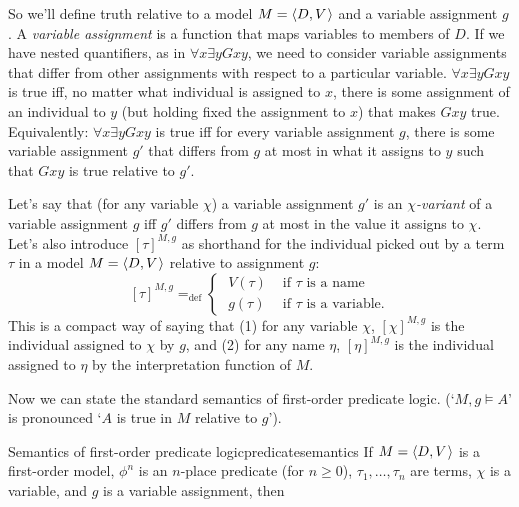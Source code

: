 So we'll define truth relative to a model $M = \t{D,V}$ and a variable
assignment $g$. A \emph{variable assignment} is a function that maps variables
to members of $D$. If we have nested quantifiers, as in
$\forall x \exists y Gxy$, we need to consider variable assignments that differ
from other assignments with respect to a particular variable.
$\forall x \exists y Gxy$ is true iff, no matter what individual is assigned to
$x$, there is some assignment of an individual to $y$ (but holding fixed the
assignment to $x$) that makes $Gxy$ true. Equivalently: $\forall x\exists y Gxy$
is true iff for every variable assignment $g$, there is some variable assignment
$g'$ that differs from $g$ at most in what it assigns to $y$ such that $Gxy$ is
true relative to $g'$.

Let's say that (for any variable $\chi$) a variable assignment $g'$ is an
\emph{$\chi$-variant} of a variable assignment $g$ iff $g'$ differs from $g$ at
most in the value it assigns to $\chi$. Let's also introduce $[\tau]^{M,g}$ as
shorthand for the individual picked out by a term $\tau$ in a model
$M = \t{D,V}$ relative to assignment $g$:
\[
  [\tau]^{M,g} =_\text{def} \begin{cases} \;V(\tau) & \text{ if $\tau$ is a name}\\
    \;g(\tau) & \text{ if $\tau$ is a variable}.
  \end{cases}
\]
This is a compact way of saying that (1) for any variable $\chi$, $[\chi]^{M,g}$
is the individual assigned to $\chi$ by $g$, and (2) for any name $\eta$,
$[\eta]^{M,g}$ is the individual assigned to $\eta$ by the interpretation function
of $M$.

Now we can state the standard semantics of first-order predicate logic.
(`$M,g \models A$' is pronounced `$A$ is true in $M$ relative to $g$').

\begin{definition}{Semantics of first-order predicate logic}{predicatesemantics}
  If $M = \t{D,V}$ is a first-order model, $\phi^{n}$ is an $n$-place predicate
  (for $n\geq 0$), $\tau_1,\ldots,\tau_n$ are terms, $\chi$ is a variable, and
  $g$ is a variable assignment, then
  
  \medskip
  \begin{semantics}
  \end{semantics}
\end{definition}

